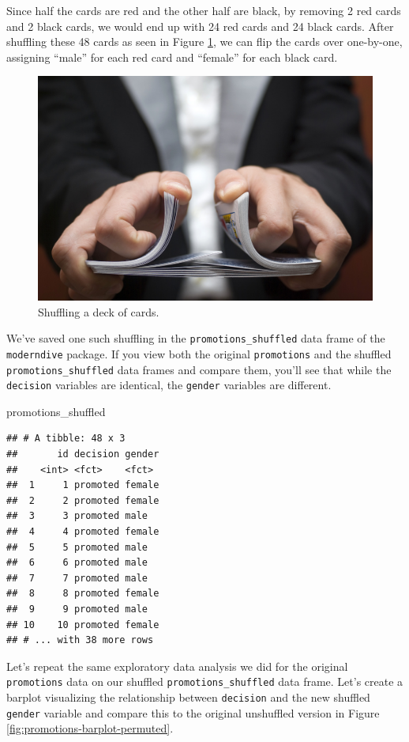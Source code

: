 \documentclass[
]{book}
\newenvironment{Shaded}{\begin{snugshade}}{\end{snugshade}}
\newcommand{\NormalTok}[1]{#1}
\begin{document}
Since half the cards are red and the other half are black, by removing 2 red cards and 2 black cards, we would end up with 24 red cards and 24 black cards. After shuffling these 48 cards as seen in Figure \ref{fig:shuffling}, we can flip the cards over one-by-one, assigning ``male'' for each red card and ``female'' for each black card.

\begin{figure}
\includegraphics[width=0.66\linewidth]{images/shutterstock/shutterstock_128283971} \caption{Shuffling a deck of cards.}\label{fig:shuffling}
\end{figure}

We've saved one such shuffling in the \texttt{promotions\_shuffled} data frame of the \texttt{moderndive} package. If you view both the original \texttt{promotions} and the shuffled \texttt{promotions\_shuffled} data frames and compare them, you'll see that while the \texttt{decision} variables are identical, the \texttt{gender} variables are different.

\begin{Shaded}
\begin{Highlighting}[]
\NormalTok{promotions_shuffled}
\end{Highlighting}
\end{Shaded}

\begin{verbatim}
## # A tibble: 48 x 3
##       id decision gender
##    <int> <fct>    <fct> 
##  1     1 promoted female
##  2     2 promoted female
##  3     3 promoted male  
##  4     4 promoted female
##  5     5 promoted male  
##  6     6 promoted male  
##  7     7 promoted male  
##  8     8 promoted female
##  9     9 promoted male  
## 10    10 promoted female
## # ... with 38 more rows
\end{verbatim}

Let's repeat the same exploratory data analysis we did for the original \texttt{promotions} data on our shuffled \texttt{promotions\_shuffled} data frame. Let's create a barplot visualizing the relationship between \texttt{decision} and the new shuffled \texttt{gender} variable and compare this to the original unshuffled version in Figure \ref{fig:promotions-barplot-permuted}.
\end{document}

